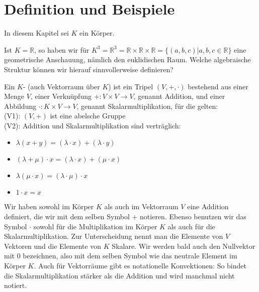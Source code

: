 \section{Definition und Beispiele}

In diesem Kapitel sei $K$ ein Körper.

\begin{example}
	Ist $K=\mathbb R$, so haben wir für $K^3=\mathbb R^3=\mathbb R \times \mathbb R \times \mathbb R=
	\{(a,b,c) | a,b,c \in \mathbb R\}$ eine geometrische Anschauung, nämlich den euklidischen Raum. Welche algebraische 
	Struktur können wir hierauf sinnvollerweise definieren?
\end{example}

\begin{definition}[Vektorraum]
	Ein $K$- (auch Vektorraum über $K$) ist ein Tripel $(V,+,\cdot)$ 
	bestehend aus einer Menge $V$, einer Verknüpfung $+: V \times V \to V$, genannt Addition, und einer Abbildung 
	$\cdot: K \times V \to V$, genannt Skalarmultiplikation, für die gelten: \\
	(V1): $(V,+)$ ist eine abelsche Gruppe \\
	(V2): Addition und Skalarmultiplikation sind verträglich:
	\begin{itemize}
		\item $\lambda(x+y)=(\lambda\cdot x)+(\lambda\cdot y)$
		\item $(\lambda+\mu)\cdot x = (\lambda\cdot x)+(\mu\cdot x)$
		\item $\lambda(\mu\cdot x)=(\lambda\cdot\mu)\cdot x$
		\item $1\cdot x = x$
	\end{itemize}
\end{definition}

\begin{remark}
	Wir haben sowohl im Körper $K$ als auch im Vektorraum $V$ eine Addition definiert, die wir mit 
	dem selben Symbol $+$ notieren. Ebenso benutzen wir das Symbol $\cdot$ sowohl für die Multiplikation im Körper $K$ 
	als auch für die Skalarmultiplikation. Zur Unterscheidung nennt man die Elemente von $V$ Vektoren und die Elemente 
	von $K$ Skalare. Wir werden bald auch den Nullvektor mit 0 bezeichnen, also mit dem selben Symbol wie das neutrale 
	Element im Körper $K$. Auch für Vektorräume gibt es notationelle Konvektionen: So bindet die Skalarmultiplikation 
	stärker als die Addition und wird manchmal nicht notiert.
\end{remark}

